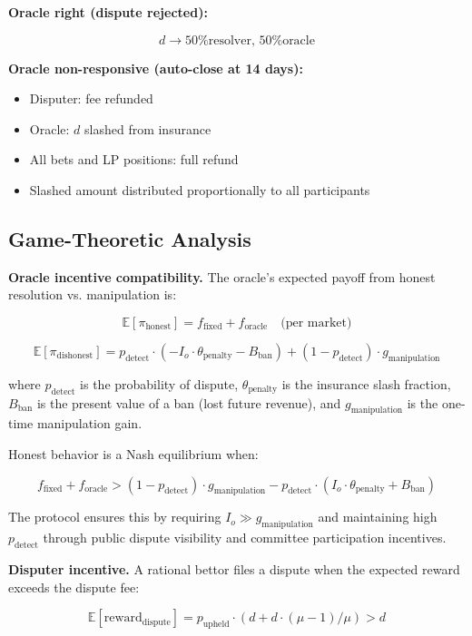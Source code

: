 \documentclass{ledger}
\theoremstyle{plain}
\theoremstyle{remark}
\begin{document}
\textbf{Oracle right (dispute rejected):}

\[
d \rightarrow \text{50\% resolver, 50\% oracle}
\]

\textbf{Oracle non-responsive (auto-close at 14 days):}

\begin{itemize}
  \item Disputer: fee refunded
  \item Oracle: $d$ slashed from insurance
  \item All bets and LP positions: full refund
  \item Slashed amount distributed proportionally to all participants
\end{itemize}

\subsection{Game-Theoretic Analysis}\label{sec:gametheory}

\textbf{Oracle incentive compatibility.} The oracle's expected payoff from
honest resolution vs. manipulation is:

\[
\mathbb{E}[\pi_{\text{honest}}] = f_{\text{fixed}} + f_{\text{oracle}} \quad
\text{(per market)}
\]

\[
\mathbb{E}[\pi_{\text{dishonest}}] = p_{\text{detect}} \cdot (-I_o \cdot
\theta_{\text{penalty}} - B_{\text{ban}}) + (1 - p_{\text{detect}}) \cdot
g_{\text{manipulation}}
\]

where $p_{\text{detect}}$ is the probability of dispute, $\theta_{\text{penalty}}$
is the insurance slash fraction, $B_{\text{ban}}$ is the present value of a ban
(lost future revenue), and $g_{\text{manipulation}}$ is the one-time
manipulation gain.

Honest behavior is a Nash equilibrium when:

\[
f_{\text{fixed}} + f_{\text{oracle}} > (1 - p_{\text{detect}}) \cdot
g_{\text{manipulation}} - p_{\text{detect}} \cdot (I_o \cdot \theta_{\text{penalty}}
+ B_{\text{ban}})
\]

The protocol ensures this by requiring $I_o \gg g_{\text{manipulation}}$ and
maintaining high $p_{\text{detect}}$ through public dispute visibility and
committee participation incentives.

\textbf{Disputer incentive.} A rational bettor files a dispute when the expected
reward exceeds the dispute fee:

\[
\mathbb{E}[\text{reward}_{\text{dispute}}] = p_{\text{upheld}} \cdot (d + d \cdot
(\mu - 1) / \mu) > d
\]
\end{document}
